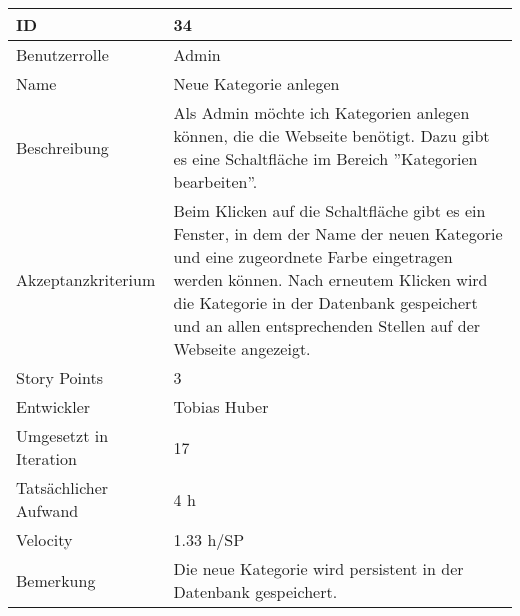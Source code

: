 \begin{tabularx}{\textwidth}{|p{}|X|}
	\hline
	ID & 34\\
	\hline
	Benutzerrolle & Admin\\
	\hline
	Name & Neue Kategorie anlegen\\
	\hline
	Beschreibung & Als Admin möchte ich Kategorien anlegen können, die die Webseite benötigt. Dazu gibt es eine Schaltfläche im Bereich ''Kategorien bearbeiten''.\\
	\hline
	Akzeptanzkriterium & Beim Klicken auf die Schaltfläche gibt es ein Fenster, in dem der Name der neuen Kategorie und eine zugeordnete Farbe eingetragen werden können. Nach erneutem Klicken wird die Kategorie in der Datenbank gespeichert und an allen entsprechenden Stellen auf der Webseite angezeigt.\\
	\hline
	Story Points & 3 \\
	\hline
	Entwickler & Tobias Huber\\
	\hline
	Umgesetzt in Iteration & 17\\
	\hline
	Tatsächlicher Aufwand & 4 h\\
	\hline
	Velocity & 1.33 h/SP\\
	\hline
	Bemerkung & Die neue Kategorie wird persistent in der Datenbank gespeichert.\\
	\hline
\end{tabularx}
\vspace{20pt}
